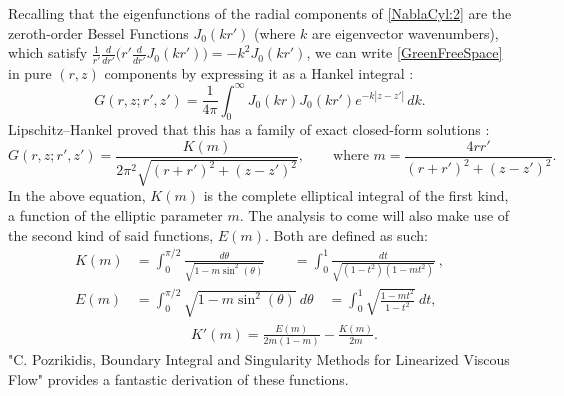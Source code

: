 \documentclass[11pt,a4paper]{article}
\begin{document}
	Recalling that the eigenfunctions of the radial components of \eqref{NablaCyl:2} are the zeroth-order Bessel Functions $J_0(kr')$  (where $k$ are eigenvector wavenumbers), which satisfy $\frac{1}{r'}\frac{d}{dr'}\big(r'\frac{d}{dr'}J_0(k r')\big) = -k^2 J_0(k r')$, we can write \eqref{GreenFreeSpace} in pure $(r,z)$ components by expressing it as a Hankel integral :
	\begin{equation}
		\label{GreenHankel}
		G(r, z; r', z') = \frac{1}{4\pi} \int_0^\infty J_0(k r) J_0(k r') e^{-k|z-z'|} \, dk.
	\end{equation}
	Lipschitz–Hankel  proved that this has a family of exact closed-form solutions :
	\begin{equation}
		\label{GreenElliptic}
		G(r,z; r',z') = \frac{K(m)}{2\pi^2\sqrt{(r+r')^2+(z-z')^2}}, \qquad
		\text{where } m = \frac{4rr'}{(r+r')^2 + (z-z')^2}.
	\end{equation}
	In the above equation, $K(m)$ is the complete elliptical integral of the first kind, a function of the elliptic parameter $m$. The analysis to come will also make use of the second kind of said functions, $E(m)$. Both are defined as such: 
	\begin{subequations}
		\label{EllipticalIntegrals}
		\begin{align}
			K(m) &= \int^{\pi/2}_0 \frac{d\theta}{\sqrt{1-m\sin^2(\theta)}}\qquad = \int_0^1 \frac{dt}{\sqrt{(1-t^2)(1-mt^2)}}\ , \label{EllipticalIntegrals:K} \\
			E(m) &= \int^{\pi/2}_0 {\sqrt{1-m\sin^2(\theta)}}\ d\theta\quad = \int_0^1 \sqrt{\frac{1-mt^2}{1-t^2}} \ dt, \label{EllipticalIntegrals:E} \\
		&\qquad \qquad	K'(m) = \frac{E(m)}{2m(1-m)} - \frac{K(m)}{2m}. \label{EllipticalIntegrals:Derivative}
		\end{align}
	\end{subequations}
	"C. Pozrikidis, Boundary Integral and Singularity Methods for Linearized Viscous Flow" provides a fantastic derivation of these functions.
	
\end{document}
